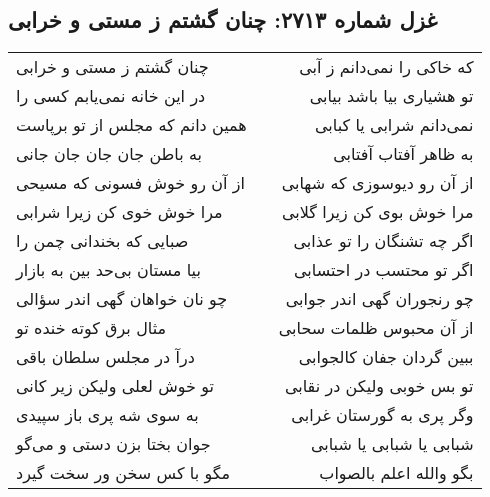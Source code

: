 \begin{center}
\section*{غزل شماره ۲۷۱۳: چنان گشتم ز مستی و خرابی}
\label{sec:2713}
\begin{longtable}{l p{0.5cm} r}
چنان گشتم ز مستی و خرابی
&&
که خاکی را نمی‌دانم ز آبی
\\
در این خانه نمی‌یابم کسی را
&&
تو هشیاری بیا باشد بیابی
\\
همین دانم که مجلس از تو برپاست
&&
نمی‌دانم شرابی یا کبابی
\\
به باطن جان جان جان جانی
&&
به ظاهر آفتاب آفتابی
\\
از آن رو خوش فسونی که مسیحی
&&
از آن رو دیوسوزی که شهابی
\\
مرا خوش خوی کن زیرا شرابی
&&
مرا خوش بوی کن زیرا گلابی
\\
صبایی که بخندانی چمن را
&&
اگر چه تشنگان را تو عذابی
\\
بیا مستان بی‌حد بین به بازار
&&
اگر تو محتسب در احتسابی
\\
چو نان خواهان گهی اندر سؤالی
&&
چو رنجوران گهی اندر جوابی
\\
مثال برق کوته خنده تو
&&
از آن محبوس ظلمات سحابی
\\
درآ در مجلس سلطان باقی
&&
ببین گردان جفان کالجوابی
\\
تو خوش لعلی ولیکن زیر کانی
&&
تو بس خوبی ولیکن در نقابی
\\
به سوی شه پری باز سپیدی
&&
وگر پری به گورستان غرابی
\\
جوان بختا بزن دستی و می‌گو
&&
شبابی یا شبابی یا شبابی
\\
مگو با کس سخن ور سخت گیرد
&&
بگو والله اعلم بالصواب
\\
\end{longtable}
\end{center}
